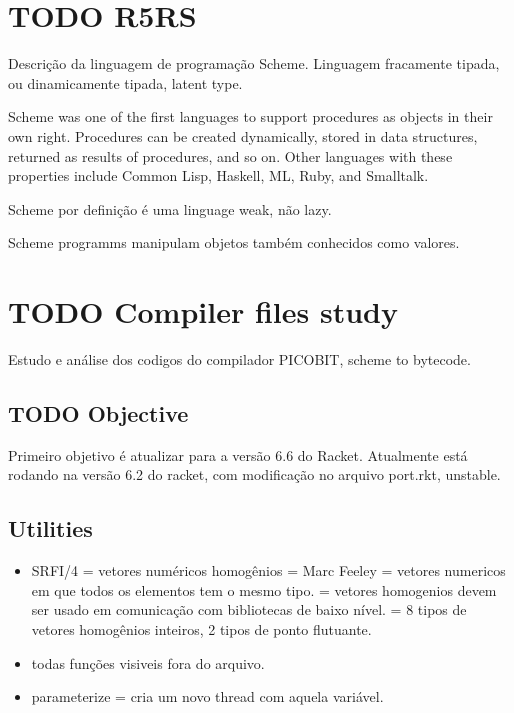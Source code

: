 \documentclass[11pt]{article}
\begin{document}
\section{{\bfseries\sffamily TODO} R5RS}
\label{sec-2}

Descrição da linguagem de programação Scheme. Linguagem fracamente tipada, ou dinamicamente tipada, latent type.

Scheme was one of the first languages to support procedures as objects in their own right. Procedures can be created dynamically, stored in data structures, returned as results of procedures, and so on. Other languages with these properties include Common Lisp, Haskell, ML, Ruby, and Smalltalk.

Scheme por definição é uma linguage weak, não lazy.

Scheme programms manipulam objetos também conhecidos como valores. 

\section{{\bfseries\sffamily TODO} Compiler files study}
\label{sec-3}
Estudo e análise dos codigos do compilador PICOBIT, scheme to bytecode.

\subsection{{\bfseries\sffamily TODO} Objective}
\label{sec-3-1}
Primeiro objetivo é atualizar para a versão 6.6 do Racket. Atualmente está rodando na versão 6.2 do racket, com modificação no arquivo port.rkt, unstable.

\subsection{Utilities}
\label{sec-3-2}

\begin{itemize}
\item SRFI/4 = vetores numéricos homogênios
= Marc Feeley
= vetores numericos em que todos os elementos tem o mesmo tipo.
= vetores homogenios devem ser usado em comunicação com bibliotecas de baixo nível.
= 8 tipos de vetores homogênios inteiros, 2 tipos de ponto flutuante.

\item todas funções visiveis fora do arquivo.
\item parameterize = cria um novo thread com aquela variável.
\end{itemize}
\end{document}
